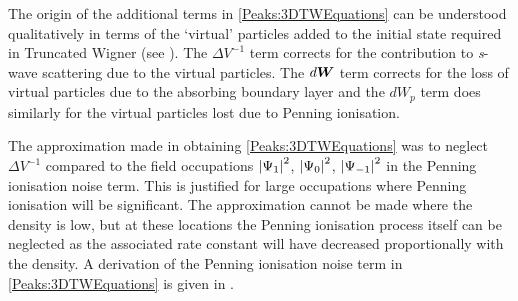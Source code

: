 The origin of the additional terms in \eqref{Peaks:3DTWEquations} can be understood qualitatively in terms of the `virtual' particles added to the initial state required in Truncated Wigner (see ). The $\Delta V^{-1}$ term corrects for the contribution to \emph{s}-wave scattering due to the virtual particles. The $d \bm{W}$ term corrects for the loss of virtual particles due to the absorbing boundary layer and the $dW_p$ term does similarly for the virtual particles lost due to Penning ionisation.

The approximation made in obtaining \eqref{Peaks:3DTWEquations} was to neglect $\Delta V^{-1}$ compared to the field occupations $\left|\Psi_1\right|^2$, $\left|\Psi_0\right|^2$, $\left|\Psi_{-1}\right|^2$ in the Penning ionisation noise term. This is justified for large occupations where Penning ionisation will be significant. The approximation cannot be made where the density is low, but at these locations the Penning ionisation process itself can be neglected as the associated rate constant will have decreased proportionally with the density. A derivation of the Penning ionisation noise term in \eqref{Peaks:3DTWEquations} is given in .

\parasep

